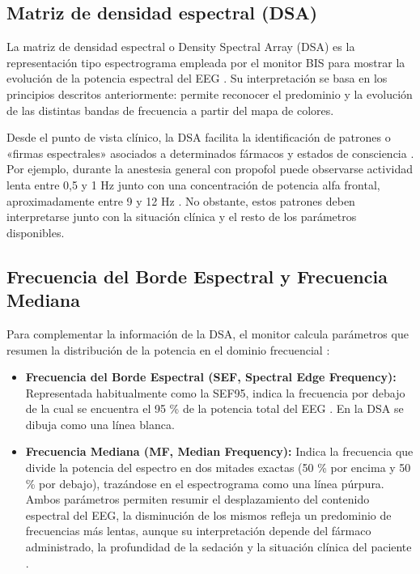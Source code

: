\documentclass[
  spanish,
  a4paper,
  12pt,
  twoside]{memoir}
\begin{document}
\subsection{Matriz de densidad espectral
(DSA)}\label{matriz-de-densidad-espectral-dsa}

La matriz de densidad espectral o Density Spectral Array (DSA) es la
representación tipo espectrograma empleada por el monitor BIS para
mostrar la evolución de la potencia espectral del EEG
\citep{OchoaSolana2025}. Su interpretación se basa en los principios
descritos anteriormente: permite reconocer el predominio y la evolución
de las distintas bandas de frecuencia a partir del mapa de colores.

Desde el punto de vista clínico, la DSA facilita la identificación de
patrones o «firmas espectrales» asociados a determinados fármacos y
estados de consciencia \citep{LpezCastruita2023}. Por ejemplo, durante
la anestesia general con propofol puede observarse actividad lenta entre
0,5 y 1 Hz junto con una concentración de potencia alfa frontal,
aproximadamente entre 9 y 12 Hz \citep{LpezCastruita2023}. No obstante,
estos patrones deben interpretarse junto con la situación clínica y el
resto de los parámetros disponibles.

\subsection{Frecuencia del Borde Espectral y Frecuencia
Mediana}\label{frecuencia-del-borde-espectral-y-frecuencia-mediana}

Para complementar la información de la DSA, el monitor calcula
parámetros que resumen la distribución de la potencia en el dominio
frecuencial \citep{OchoaSolana2025}:

\begin{itemize}
\item
  \textbf{Frecuencia del Borde Espectral (SEF, Spectral Edge
  Frequency):} Representada habitualmente como la SEF95, indica la
  frecuencia por debajo de la cual se encuentra el 95 \% de la potencia
  total del EEG \citep{OchoaSolana2025}. En la DSA se dibuja como una
  línea blanca.
\item
  \textbf{Frecuencia Mediana (MF, Median Frequency):} Indica la
  frecuencia que divide la potencia del espectro en dos mitades exactas
  (50 \% por encima y 50 \% por debajo), trazándose en el espectrograma
  como una línea púrpura. Ambos parámetros permiten resumir el
  desplazamiento del contenido espectral del EEG, la disminución de los
  mismos refleja un predominio de frecuencias más lentas, aunque su
  interpretación depende del fármaco administrado, la profundidad de la
  sedación y la situación clínica del paciente \citep{OchoaSolana2025}.
\end{itemize}
\end{document}
